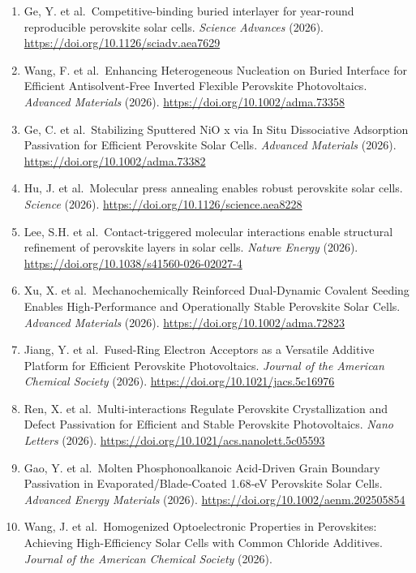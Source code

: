 \documentclass[
  11pt,
]{article}
\begin{document}
\begin{enumerate}
  \url{https://doi.org/10.1038/s41467-026-69198-2}
\item
  Ge, Y. et al.~Competitive-binding buried interlayer for year-round
  reproducible perovskite solar cells. \emph{Science Advances} (2026).
  \url{https://doi.org/10.1126/sciadv.aea7629}
\item
  Wang, F. et al.~Enhancing Heterogeneous Nucleation on Buried Interface
  for Efficient Antisolvent‐Free Inverted Flexible Perovskite
  Photovoltaics. \emph{Advanced Materials} (2026).
  \url{https://doi.org/10.1002/adma.73358}
\item
  Ge, C. et al.~Stabilizing Sputtered NiO x via In Situ Dissociative
  Adsorption Passivation for Efficient Perovskite Solar Cells.
  \emph{Advanced Materials} (2026).
  \url{https://doi.org/10.1002/adma.73382}
\item
  Hu, J. et al.~Molecular press annealing enables robust perovskite
  solar cells. \emph{Science} (2026).
  \url{https://doi.org/10.1126/science.aea8228}
\item
  Lee, S.H. et al.~Contact-triggered molecular interactions enable
  structural refinement of perovskite layers in solar cells.
  \emph{Nature Energy} (2026).
  \url{https://doi.org/10.1038/s41560-026-02027-4}
\item
  Xu, X. et al.~Mechanochemically Reinforced Dual‐Dynamic Covalent
  Seeding Enables High‐Performance and Operationally Stable Perovskite
  Solar Cells. \emph{Advanced Materials} (2026).
  \url{https://doi.org/10.1002/adma.72823}
\item
  Jiang, Y. et al.~Fused-Ring Electron Acceptors as a Versatile Additive
  Platform for Efficient Perovskite Photovoltaics. \emph{Journal of the
  American Chemical Society} (2026).
  \url{https://doi.org/10.1021/jacs.5c16976}
\item
  Ren, X. et al.~Multi-interactions Regulate Perovskite Crystallization
  and Defect Passivation for Efficient and Stable Perovskite
  Photovoltaics. \emph{Nano Letters} (2026).
  \url{https://doi.org/10.1021/acs.nanolett.5c05593}
\item
  Gao, Y. et al.~Molten Phosphonoalkanoic Acid‐Driven Grain Boundary
  Passivation in Evaporated/Blade‐Coated 1.68‐eV Perovskite Solar Cells.
  \emph{Advanced Energy Materials} (2026).
  \url{https://doi.org/10.1002/aenm.202505854}
\item
  Wang, J. et al.~Homogenized Optoelectronic Properties in Perovskites:
  Achieving High-Efficiency Solar Cells with Common Chloride Additives.
  \emph{Journal of the American Chemical Society} (2026).

\end{enumerate}
\end{document}
